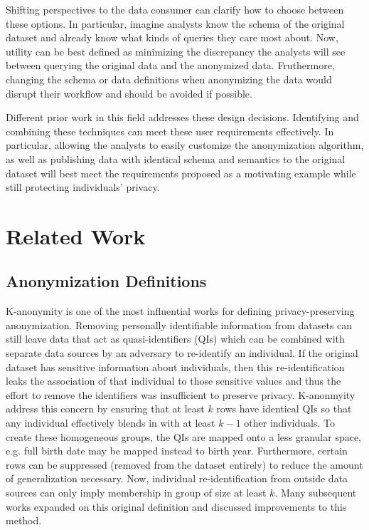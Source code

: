 Shifting perspectives to the data consumer can clarify how to choose between these options. In particular, imagine analysts know the schema of the original dataset and already know what kinds of queries they care most about. Now, utility can be best defined as minimizing the discrepancy the analysts will see between querying the original data and the anonymized data. Fruthermore, changing the schema or data definitions when anonymizing the data would disrupt their workflow and should be avoided if possible.

Different prior work in this field addresses these design decisions. Identifying and combining these techniques can meet these user requirements effectively. In particular, allowing the analysts to easily customize the anonymization algorithm, as well as publishing data with identical schema and semantics to the original dataset will best meet the requirements proposed as a motivating example while still protecting individuals' privacy.

\section{Related Work}
\subsection{Anonymization Definitions}
K-anonymity\cite{sweeneykAnonymity} is one of the most influential works for defining privacy-preserving anonymization. Removing personally identifiable information from datasets can still leave data that act as quasi-identifiers (QIs) which can be combined with separate data sources by an adversary to re-identify an individual. If the original dataset has sensitive information about individuals, then this re-identification leaks the association of that individual to those sensitive values and thus the effort to remove the identifiers was insufficient to preserve privacy. K-anonmyity address this concern by ensuring that at least $k$ rows have identical QIs so that any individual effectively blends in with at least $k-1$ other individuals. To create these homogeneous groups, the QIs are mapped onto a less granular space, e.g. full birth date may be mapped instead to birth year. Furthermore, certain rows can be suppressed (removed from the dataset entirely) to reduce the amount of generalization necessary. Now, individual re-identification from outside data sources can only imply membership in group of size at least $k$. Many subsequent works expanded on this original definition and discussed improvements to this method.


